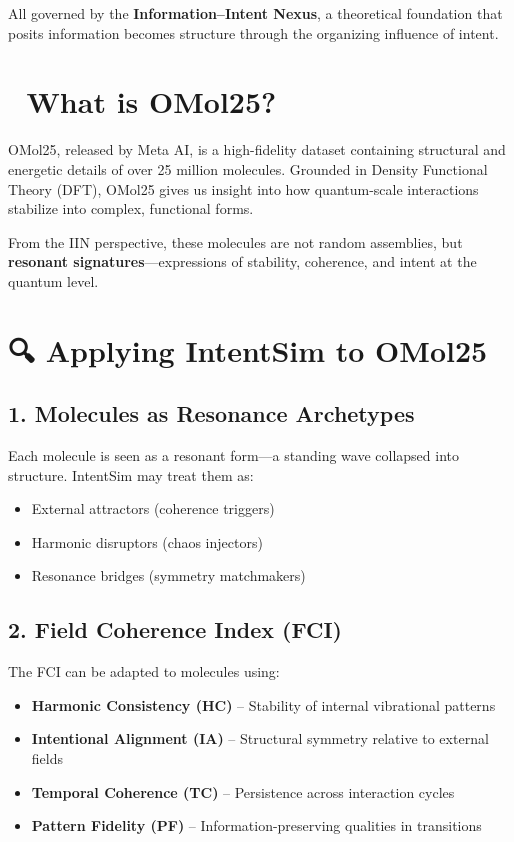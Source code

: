 \documentclass[12pt]{article}
\begin{document}
All governed by the \textbf{Information–Intent Nexus}, a theoretical foundation that posits information becomes structure through the organizing influence of intent.

\section*{🧬 What is OMol25?}

OMol25, released by Meta AI, is a high-fidelity dataset containing structural and energetic details of over 25 million molecules. Grounded in Density Functional Theory (DFT), OMol25 gives us insight into how quantum-scale interactions stabilize into complex, functional forms.

From the IIN perspective, these molecules are not random assemblies, but \textbf{resonant signatures}—expressions of stability, coherence, and intent at the quantum level.

\section*{🔍 Applying IntentSim to OMol25}

\subsection*{1. Molecules as Resonance Archetypes}
Each molecule is seen as a resonant form—a standing wave collapsed into structure. IntentSim may treat them as:
\begin{itemize}
  \item External attractors (coherence triggers)
  \item Harmonic disruptors (chaos injectors)
  \item Resonance bridges (symmetry matchmakers)
\end{itemize}

\subsection*{2. Field Coherence Index (FCI)}
The FCI can be adapted to molecules using:
\begin{itemize}
  \item \textbf{Harmonic Consistency (HC)} – Stability of internal vibrational patterns
  \item \textbf{Intentional Alignment (IA)} – Structural symmetry relative to external fields
  \item \textbf{Temporal Coherence (TC)} – Persistence across interaction cycles
  \item \textbf{Pattern Fidelity (PF)} – Information-preserving qualities in transitions
\end{itemize}
\end{document}
